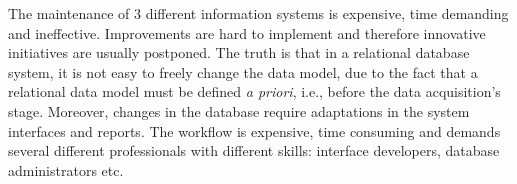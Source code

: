 
The maintenance of 3 different information systems is expensive, time
demanding and ineffective. Improvements are hard to implement and
therefore innovative initiatives are usually postponed.
The truth is that in a relational database system, it is not easy to
freely change the data model, due to the
fact that a relational data model must be defined \emph{a
  priori}, i.e., before the  data acquisition's stage. Moreover,
changes in the database require adaptations in
the system interfaces and reports. The workflow is expensive, time
consuming and demands several different professionals with different
skills: interface developers, database administrators etc.

%


